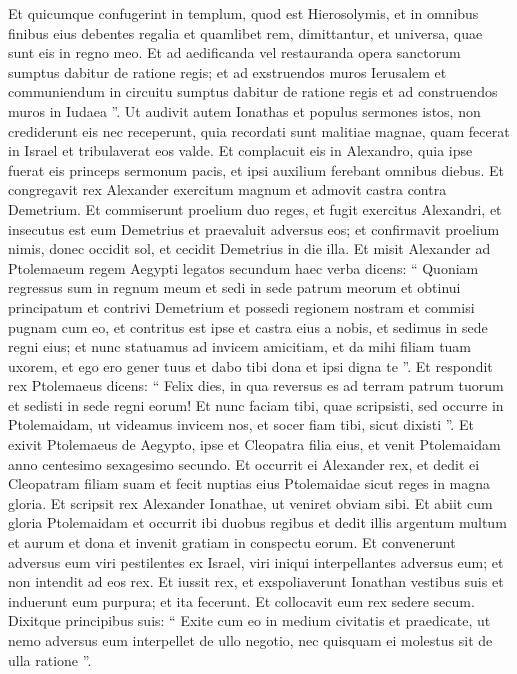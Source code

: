\begin{biblechapter}
\begin{biblechapter}
\begin{biblechapter}
\begin{biblechapter}
\begin{biblechapter}
\begin{biblechapter}
\begin{biblechapter}
\begin{biblechapter}
\begin{biblechapter}
\begin{biblechapter}
\verse Et quicumque confugerint in templum, quod est Hierosolymis, et in omnibus finibus eius debentes regalia et quamlibet rem, dimittantur, et universa, quae sunt eis in regno meo. 
\verse Et ad aedificanda vel restauranda opera sanctorum sumptus dabitur de ratione regis; 
 \verse et ad exstruendos muros Ierusalem et communiendum in circuitu sumptus dabitur de ratione regis et ad construendos muros in Iudaea ”.
 \verse Ut audivit autem Ionathas et populus sermones istos, non crediderunt eis nec receperunt, quia recordati sunt malitiae magnae, quam fecerat in Israel et tribulaverat eos valde. 
\verse Et complacuit eis in Alexandro, quia ipse fuerat eis princeps sermonum pacis, et ipsi auxilium ferebant omnibus diebus. 
\verse Et congregavit rex Alexander exercitum magnum et admovit castra contra Demetrium. 
\verse Et commiserunt proelium duo reges, et fugit exercitus Alexandri, et insecutus est eum Demetrius et praevaluit adversus eos; 
\verse et confirmavit proelium nimis, donec occidit sol, et cecidit Demetrius in die illa.
 \verse Et misit Alexander ad Ptolemaeum regem Aegypti legatos secundum haec verba dicens: 
\verse “ Quoniam regressus sum in regnum meum et sedi in sede patrum meorum et obtinui principatum et contrivi Demetrium et possedi regionem nostram 
\verse et commisi pugnam cum eo, et contritus est ipse et castra eius a nobis, et sedimus in sede regni eius; 
\verse et nunc statuamus ad invicem amicitiam, et da mihi filiam tuam uxorem, et ego ero gener tuus et dabo tibi dona et ipsi digna te ”. 
\verse Et respondit rex Ptolemaeus dicens: “ Felix dies, in qua reversus es ad terram patrum tuorum et sedisti in sede regni eorum! 
\verse Et nunc faciam tibi, quae scripsisti, sed occurre in Ptolemaidam, ut videamus invicem nos, et socer fiam tibi, sicut dixisti ”. 
\verse Et exivit Ptolemaeus de Aegypto, ipse et Cleopatra filia eius, et venit Ptolemaidam anno centesimo sexagesimo secundo. 
\verse Et occurrit ei Alexander rex, et dedit ei Cleopatram filiam suam et fecit nuptias eius Ptolemaidae sicut reges in magna gloria.
 \verse Et scripsit rex Alexander Ionathae, ut veniret obviam sibi. 
\verse Et abiit cum gloria Ptolemaidam et occurrit ibi duobus regibus et dedit illis argentum multum et aurum et dona et invenit gratiam in conspectu eorum. 
\verse Et convenerunt adversus eum viri pestilentes ex Israel, viri iniqui interpellantes adversus eum; et non intendit ad eos rex. 
\verse Et iussit rex, et exspoliaverunt Ionathan vestibus suis et induerunt eum purpura; et ita fecerunt. Et collocavit eum rex sedere secum. 
\verse Dixitque principibus suis: “ Exite cum eo in medium civitatis et praedicate, ut nemo adversus eum interpellet de ullo negotio, nec quisquam ei molestus sit de ulla ratione ”. 

\end{biblechapter}
\end{biblechapter}
\end{biblechapter}
\end{biblechapter}
\end{biblechapter}
\end{biblechapter}
\end{biblechapter}
\end{biblechapter}
\end{biblechapter}
\end{biblechapter}
